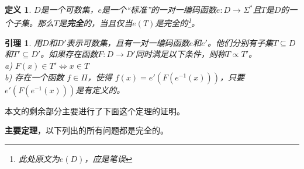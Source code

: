 \documentclass[twocolumn]{article}
\newtheorem{definition}{\hspace{2em}定义}
\newtheorem{lemma}{\hspace{2em}引理}
\theoremstyle{nonumberplain}%
\begin{document}
    \begin{definition}
        $D$是一个可数集，$e$是一个“标准”的一对一编码函数$e:D\rightarrow\Sigma^*$且$T$是$D$的一个子集。那么$T$是{\bf 完全}的，当且仅当$e(T)$是完全的\footnote{此处原文为$e(D)$，应是笔误}。
    \end{definition}

    \begin{lemma}
        用$D$和$D'$表示可数集，且有一对一编码函数$e$和$e'$。他们分别有子集$T\subseteq D$和$T'\subseteq D'$。如果存在函数$F:D\rightarrow D'$同时满足以下条件，则称$T\propto T'$。\\
        \indent a) $F(x)\in T' \Leftrightarrow x\in T$\\
        \indent b) 存在一个函数 $f\in\Pi$，使得 $f(x)=e'(F(e^{-1}(x)))$，只要$e'(F(e^{-1}(x)))$是有定义的。\\
    \end{lemma}

    本文的剩余部分主要进行了下面这个定理的证明。

    {\bf 主要定理}，以下列出的所有问题都是完全的。
\end{document}
